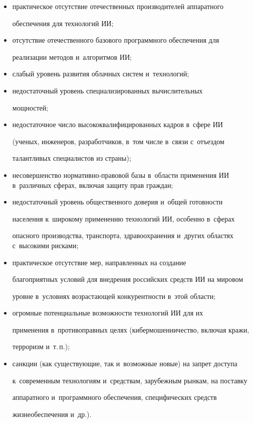     \begin{itemize}

\item практическое отсутствие отечественных производителей аппаратного 

обеспечения для технологий ИИ;

\item отсутствие отечественного базового программного обеспечения для 

реализации методов и~алгоритмов ИИ;

\item слабый уровень развития облачных систем и~технологий;

\item недостаточный уровень специализированных вычислительных 

мощностей;

\item недостаточное число высококвалифицированных кадров в~сфере ИИ 

(ученых, инженеров, разработчиков, в~том числе в~связи с~отъездом 

талантливых специалистов из страны);

\item несовершенство нормативно-правовой базы в~области применения ИИ в~различных сферах, включая защиту прав граждан;

\item недостаточный уровень общественного доверия и~общей готовности 

населения к~широкому применению технологий ИИ, особенно в~сферах 

опасного производства, транспорта, здравоохранения и~других областях с~высокими рисками;

\item практическое отсутствие мер, направленных на создание 

благоприятных условий для внедрения российских средств ИИ на мировом 

уровне в~условиях возрастающей конкурентности в~этой области;\\[-14pt]

\item огромные потенциальные возможности технологий ИИ для их 

применения в~противоправных целях (кибермошенничество, включая кражи, 

терроризм и~т.\,п.);\\[-14pt] 

\item санкции (как существующие, так и~возможные новые) на запрет доступа 

к~современным технологиям и~средствам, зарубежным рынкам, на поставку 

аппаратного и~программного обеспечения, специфических средств 

жизнеобеспечения и~др.).\\[-13pt] 

    \end{itemize}

